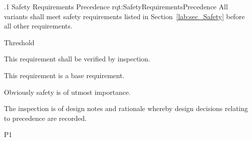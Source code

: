 \ONERQMTV
{\RqtNumberBase.1}
{Safety Requirements Precedence}
{rqt:SafetyRequirementsPrecedence}
{All \ThisSystem variants shall meet safety requirements listed in Section~\ref{lab:sec_Safety} before all other requirements.}
{
	\item [All Phases] Threshold
}
{This requirement shall be verified by inspection.}
{
	\item [N/A] This requirement is a base requirement.
}
{
	\item Obviously safety is of utmost importance.
	\item The inspection is of design notes and rationale whereby design decisions relating to precedence are recorded.
}
{P1}

